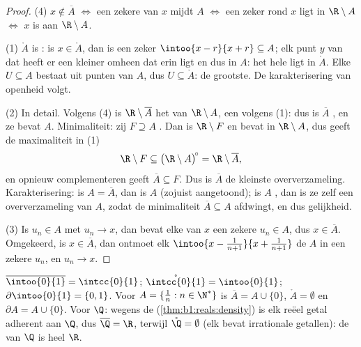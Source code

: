 \begin{proof}
(4) $x \notin \overline A$ $\iff$ een zekere  van $x$ mijdt $A$
$\iff$ een zeker  rond $x$ ligt in $\R \setminus A$ $\iff$ $x$ is
 aan $\R \setminus A$.

(1) $\mathring A$ is : is $x \in \mathring A$, dan is een zeker
$\intoo{x-r}{x+r} \subseteq A$; elk punt $y$ van dat  heeft er een
kleiner  omheen dat erin ligt en dus in $A$: het hele 
ligt in $\mathring A$. Elke  $U \subseteq A$ bestaat uit 
punten van $A$, dus $U \subseteq \mathring A$: de grootste. De
karakterisering van openheid volgt.

(2) In detail. Volgens (4) is $\R \setminus \overline A$ het 
van $\R \setminus A$, een  volgens (1): dus is $\overline
A$ , en ze bevat $A$. Minimaliteit: zij $F \supseteq A$ .
Dan is $\R \setminus F$  en bevat in $\R \setminus A$, dus geeft de
maximaliteit in (1)
\[
\R \setminus F \subseteq \bigl(\R \setminus A\bigr)^{\!\circ}
= \R \setminus \overline A ,
\]
en opnieuw complementeren geeft $\overline A \subseteq F$. Dus is
$\overline A$ de kleinste  oververzameling. Karakterisering: is
$A = \overline A$, dan is $A$  (zojuist aangetoond); is $A$
, dan is ze zelf een  oververzameling van $A$, zodat de
minimaliteit $\overline A \subseteq A$ afdwingt, en dus gelijkheid.

(3) Is $u_n \in A$ met $u_n \to x$, dan bevat elke  van $x$ een
zekere $u_n \in A$, dus $x \in \overline A$. Omgekeerd, is $x \in
\overline A$, dan ontmoet elk  $\intoo{x - \frac{1}{n+1}}{x +
\frac{1}{n+1}}$ de  $A$ in een zekere $u_n$, en $u_n \to x$.
\end{proof}

\begin{example}\label{ex:b1:topology:closureexamples}
$\overline{\intoo{0}{1}} = \intcc{0}{1}$; $\mathring{\intcc{0}{1}} =
\intoo{0}{1}$; $\partial\intoo{0}{1} = \{0, 1\}$. Voor $A = \{\frac 1n :
n \in \N^*\}$ is $\overline A = A \cup \{0\}$, $\mathring A = \emptyset$
en $\partial A = A \cup \{0\}$. Voor $\Q$: wegens de 
(\cref{thm:b1:reals:density}) is elk reëel getal adherent aan $\Q$, dus
$\overline{\Q} = \R$, terwijl $\mathring{\Q} = \emptyset$ (elk 
bevat irrationale getallen): de  van $\Q$ is heel $\R$.
\end{example}


